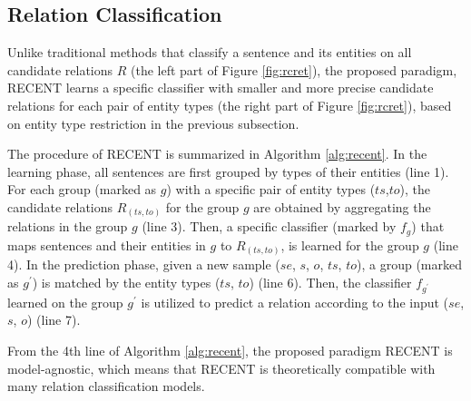 \documentclass[11pt,a4paper]{article}
\begin{document}
\subsection{Relation Classification}

Unlike traditional methods that classify a sentence and its entities on all candidate relations $R$ (the left part of Figure \ref{fig:rcret}),  
the proposed paradigm, RECENT learns a specific classifier with smaller and more precise candidate relations for each pair of entity types (the right part of Figure \ref{fig:rcret}), 
based on entity type restriction in the previous subsection.


The procedure of RECENT is summarized in Algorithm \ref{alg:recent}.
In the learning phase, all sentences are first grouped by types of their entities (line 1). 
For each group (marked as $g$) with a specific pair of entity types ($ts$,$to$), 
the candidate relations $R_{(ts,to)}$  for the group $g$ are obtained by aggregating the relations in the group $g$ (line 3).
Then, a specific classifier (marked by $f_g$) that maps sentences and their entities in $g$ to $R_{(ts,to)}$, is learned for the group $g$ (line 4).
In the prediction phase, given a new sample ($se$, $s$, $o$, $ts$, $to$), a group (marked as $g^{'}$) is matched by the entity types ($ts$, $to$) (line 6).
Then, the classifier $f_{g^{'}}$ learned on the group $g^{'}$ is utilized to predict a relation according to the input ($se$, $s$, $o$) (line 7).


From the 4th line of Algorithm \ref{alg:recent}, the proposed paradigm RECENT is model-agnostic, 
which means that 
RECENT is theoretically compatible with many relation classification models.
\end{document}
